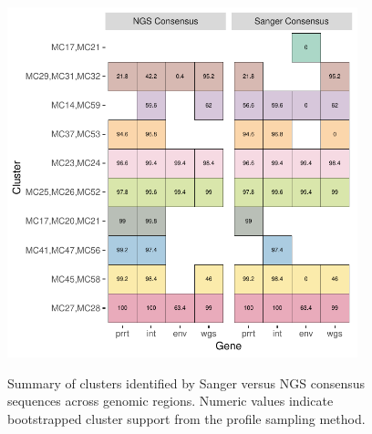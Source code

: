 \documentclass[letterpaper]{article}
\begin{document}
%

\begin{figure}[p!]
	\caption{Summary of clusters identified by Sanger versus NGS consensus sequences across genomic regions. Numeric values indicate bootstrapped cluster support from the profile sampling method.}
	\centering
	\includegraphics[width=4in]{Figure5}
	\label{fig5}
\end{figure}
\end{document}
